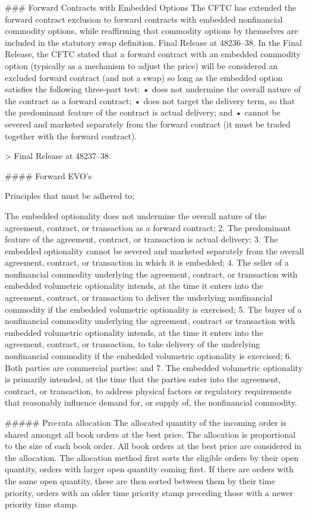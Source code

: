 \documentclass{article}
\begin{document}
### Forward Contracts with Embedded Options
The CFTC has extended the forward contract exclusion to forward contracts with embedded
nonfinancial commodity options, while reaffirming that commodity options by themselves are
included in the statutory swap definition. Final Release at 48236–38.
In the Final Release, the CFTC stated that a forward contract with an embedded commodity
option (typically as a mechanism to adjust the price) will be considered an excluded forward
contract (and not a swap) so long as the embedded option satisfies the following three-part
test:
• does not undermine the overall nature of the contract as a forward contract;
• does not target the delivery term, so that the predominant feature of the contract is actual
delivery; and
• cannot be severed and marketed separately from the forward contract (it must be traded
together with the forward contract).

> Final Release at 48237–38.

#### Forward EVO's

Principles that must be adhered to:

The embedded optionality does not undermine the overall nature of the
agreement, contract, or transaction as a forward contract;
2. The predominant feature of the agreement, contract, or transaction is actual
delivery;
3. The embedded optionality cannot be severed and marketed separately from the
overall agreement, contract, or transaction in which it is embedded;
4. The seller of a nonfinancial commodity underlying the agreement, contract, or
transaction with embedded volumetric optionality intends, at the time it enters into the
agreement, contract, or transaction to deliver the underlying nonfinancial commodity if
the embedded volumetric optionality is exercised;
5. The buyer of a nonfinancial commodity underlying the agreement, contract or
transaction with embedded volumetric optionality intends, at the time it enters into the
agreement, contract, or transaction, to take delivery of the underlying nonfinancial
commodity if the embedded volumetric optionality is exercised;
6. Both parties are commercial parties; and
7. The embedded volumetric optionality is primarily intended, at the time that the
parties enter into the agreement, contract, or transaction, to address physical factors or
regulatory requirements that reasonably influence demand for, or supply of, the
nonfinancial commodity.

##### Pro-rata allocation
The allocated quantity of the incoming order is shared amongst all book orders at the best price. The allocation is proportional to the size of each book order. All book orders at the best price are considered in the allocation. The allocation method first sorts the eligible orders by their open quantity, orders with larger open quantity coming first. If there are orders with the same open quantity, these are then sorted between them by their time priority, orders with an older time priority stamp preceding those with a newer priority time stamp.
\end{document}
